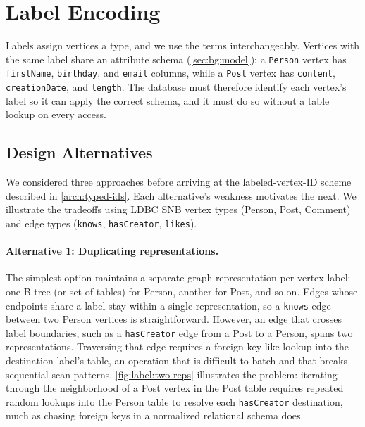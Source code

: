 \section{Label Encoding}
\label{arch:label-encoding}

Labels assign vertices a type, and we use the terms interchangeably.
Vertices with the same label share an attribute schema (\autoref{sec:bg:model}): a \texttt{Person} vertex has \texttt{firstName}, \texttt{birthday}, and \texttt{email} columns, while a \texttt{Post} vertex has \texttt{content}, \texttt{creationDate}, and \texttt{length}.
The database must therefore identify each vertex's label so it can apply the correct schema, and it must do so without a table lookup on every access.

\subsection{Design Alternatives}
\label{arch:label-alternatives}

We considered three approaches before arriving at the labeled-vertex-ID scheme described in \autoref{arch:typed-ids}.
Each alternative's weakness motivates the next.
We illustrate the tradeoffs using LDBC SNB vertex types (Person, Post, Comment) and edge types (\texttt{knows}, \texttt{hasCreator}, \texttt{likes}).

\paragraph{Alternative 1: Duplicating representations.}
The simplest option maintains a separate graph representation per vertex label: one B-tree (or set of tables) for Person, another for Post, and so on.
Edges whose endpoints share a label stay within a single representation, so a \texttt{knows} edge between two Person vertices is straightforward.
However, an edge that crosses label boundaries, such as a \texttt{hasCreator} edge from a Post to a Person, spans two representations.
Traversing that edge requires a foreign-key-like lookup into the destination label's table, an operation that is difficult to batch and that breaks sequential scan patterns.
\autoref{fig:label:two-reps} illustrates the problem: iterating through the neighborhood of a Post vertex in the Post table requires repeated random lookups into the Person table to resolve each \texttt{hasCreator} destination, much as chasing foreign keys in a normalized relational schema does.

